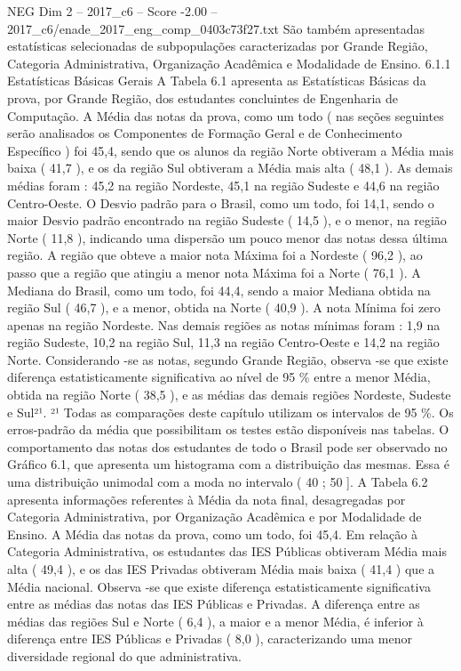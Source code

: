 \begin{textsample}{NEG Dim 2 – 2017\_c6 – Score -2.00 – 2017\_c6/enade\_2017\_eng\_comp\_0403c73f27.txt}
São também apresentadas estatísticas selecionadas de subpopulações caracterizadas por Grande Região, Categoria Administrativa, Organização Acadêmica e Modalidade de Ensino. 6.1.1 Estatísticas Básicas Gerais A Tabela 6.1 apresenta as Estatísticas Básicas da prova, por Grande Região, dos estudantes concluintes de Engenharia de Computação.
A Média das notas da prova, como um todo ( nas seções seguintes serão analisados os Componentes de Formação Geral e de Conhecimento Específico ) foi 45,4, sendo que os alunos da região Norte obtiveram a Média mais baixa ( 41,7 ), e os da região Sul obtiveram a Média mais alta ( 48,1 ).
As demais médias foram : 45,2 na região Nordeste, 45,1 na região Sudeste e 44,6 na região Centro-Oeste.
O Desvio padrão para o Brasil, como um todo, foi 14,1, sendo o maior Desvio padrão encontrado na região Sudeste ( 14,5 ), e o menor, na região Norte ( 11,8 ), indicando uma dispersão um pouco menor das notas dessa última região.
A região que obteve a maior nota Máxima foi a Nordeste ( 96,2 ), ao passo que a região que atingiu a menor nota Máxima foi a Norte ( 76,1 ).
A Mediana do Brasil, como um todo, foi 44,4, sendo a maior Mediana obtida na região Sul ( 46,7 ), e a menor, obtida na Norte ( 40,9 ).
A nota Mínima foi zero apenas na região Nordeste.
Nas demais regiões as notas mínimas foram : 1,9 na região Sudeste, 10,2 na região Sul, 11,3 na região Centro-Oeste e 14,2 na região Norte.
Considerando -se as notas, segundo Grande Região, observa -se que existe diferença estatisticamente significativa ao nível de 95 \% entre a menor Média, obtida na região Norte ( 38,5 ), e as médias das demais regiões Nordeste, Sudeste e Sul²¹. ²¹ Todas as comparações deste capítulo utilizam os intervalos de 95 \%.
Os erros-padrão da média que possibilitam os testes estão disponíveis nas tabelas.
O comportamento das notas dos estudantes de todo o Brasil pode ser observado no Gráfico 6.1, que apresenta um histograma com a distribuição das mesmas.
Essa é uma distribuição unimodal com a moda no intervalo ( 40 ; 50 ].
A Tabela 6.2 apresenta informações referentes à Média da nota final, desagregadas por Categoria Administrativa, por Organização Acadêmica e por Modalidade de Ensino.
A Média das notas da prova, como um todo, foi 45,4.
Em relação à Categoria Administrativa, os estudantes das IES Públicas obtiveram Média mais alta ( 49,4 ), e os das IES Privadas obtiveram Média mais baixa ( 41,4 ) que a Média nacional.
Observa -se que existe diferença estatisticamente significativa entre as médias das notas das IES Públicas e Privadas.
A diferença entre as médias das regiões Sul e Norte ( 6,4 ), a maior e a menor Média, é inferior à diferença entre IES Públicas e Privadas ( 8,0 ), caracterizando uma menor diversidade regional do que administrativa.

\end{textsample}
